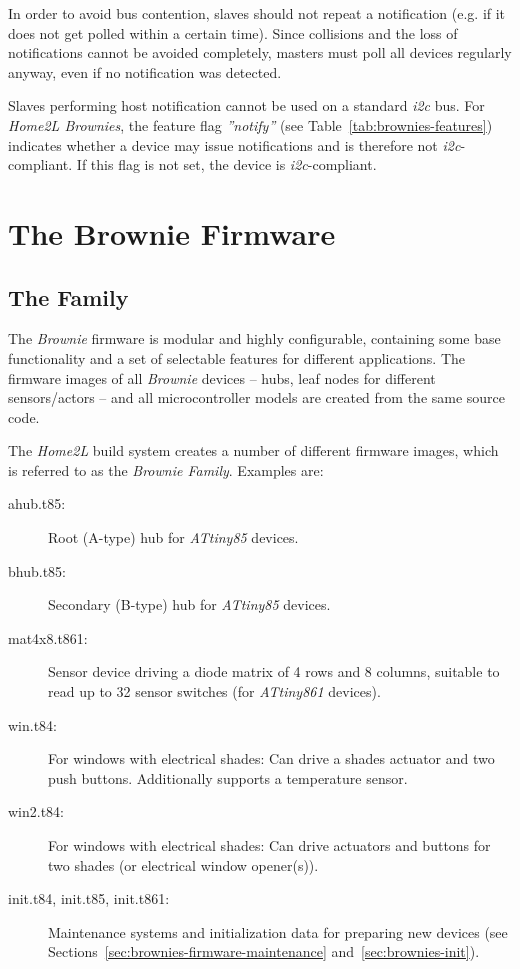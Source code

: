 \documentclass[12pt,english,parskip=half,headheight=19pt]{scrreprt}
\begin{document}
In order to avoid bus contention, slaves should not repeat a notification (e.g. if it does not get polled within a certain time). Since collisions and the loss of notifications cannot be avoided completely, masters must poll all devices regularly anyway, even if no notification was detected.

Slaves performing host notification cannot be used on a standard \textit{i2c} bus. For \textit{Home2L Brownies}, the feature flag \textit{''notify''} (see Table~\ref{tab:brownies-features}) indicates whether a device may issue notifications and is therefore not \textit{i2c}-compliant. If this flag is not set, the device is \textit{i2c}-compliant.





\clearpage
\section{The Brownie Firmware}
\label{sec:brownies-firmware}



\subsection{The Family}
\label{sec:brownies-firmware-family}

The \textit{Brownie} firmware is modular and highly configurable, containing some base functionality and a set of selectable features for different applications. The firmware images of all \textit{Brownie} devices -- hubs, leaf nodes for different sensors/actors -- and all microcontroller models are created from the same source code.

The \textit{Home2L} build system creates a number of different firmware images, which is referred to as the \textit{Brownie Family}. Examples are:

\begin{description}
  \item[ahub.t85:] Root (A-type) hub for \textit{ATtiny85} devices.
  \item[bhub.t85:] Secondary (B-type) hub for \textit{ATtiny85} devices.
  \item[mat4x8.t861:] Sensor device driving a diode matrix of 4 rows and 8 columns, suitable to read up to 32 sensor switches (for \textit{ATtiny861} devices).
  \item[win.t84:] For windows with electrical shades: Can drive a shades actuator and two push buttons. Additionally supports a temperature sensor.
  \item[win2.t84:] For windows with electrical shades: Can drive actuators and buttons for two shades (or electrical window opener(s)).
  \item[init.t84, init.t85, init.t861:] Maintenance systems and initialization data for preparing new devices (see Sections~\ref{sec:brownies-firmware-maintenance} and~\ref{sec:brownies-init}).
\end{description}
\end{document}
